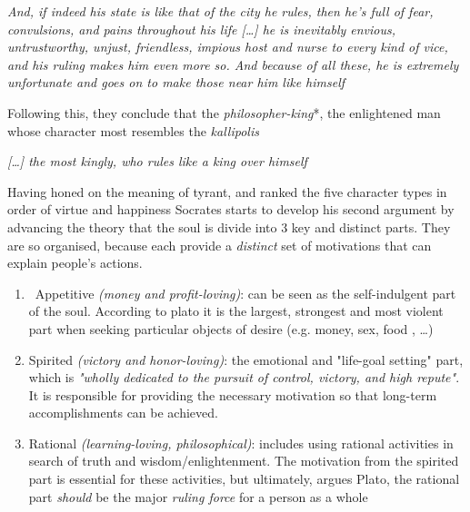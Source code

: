 \documentclass[english,course]{Notes}
\newcommand{\ita}[1]{\textit{#1}}
\newcommand\quo[1]{\begin{displayquote}\ita{\large{#1}}\end{displayquote}}
\begin{document}
\quo{And, if indeed his state is like that of the city he rules, then he's full of fear, convulsions, and pains throughout his life [\dots] he is inevitably envious, untrustworthy, unjust, friendless, impious host and nurse to every kind of vice, and his ruling makes him even more so. And because of all these, he is extremely unfortunate and goes on to make those near him like himself}

\par{Following this, they conclude that the \ita{philosopher-king}*, the enlightened man whose character most resembles the \ita{kallipolis}~}

\quo{[\dots] the most kingly, who rules like a king over himself}

\newpage
\par{Having honed on the meaning of tyrant, and ranked the five character types in order of virtue and happiness Socrates starts to develop his second argument by advancing the theory that the soul is divide into 3 key and distinct parts. They are so organised, because each provide a \ita{distinct} set of motivations that can explain people's actions.}

\begin{enumerate}
	\item ~Appetitive \ita{(money and profit-loving)}: can be seen as the self-indulgent part of the soul. According to plato it is the largest, strongest and most violent part when seeking particular objects of desire (e.g. money, sex, food , \dots)
	\item Spirited \ita{(victory and honor-loving)}: the emotional and "life-goal setting" part, which is \ita{"wholly dedicated to the pursuit of control, victory, and high repute"}. It is responsible for providing the necessary motivation so that long-term accomplishments can be achieved.
	\item Rational \ita{(learning-loving, philosophical)}: includes using rational activities in search of truth and wisdom/enlightenment. The motivation from the spirited part is essential for these activities, but ultimately, argues Plato, the rational part \ita{should} be the major \ita{ruling force} for a person as a whole
\end{enumerate}
\end{document}
